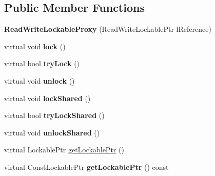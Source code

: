 \subsection*{Public Member Functions}
\begin{DoxyCompactItemize}
\item 
\hypertarget{classcore_1_1threading_1_1_read_write_lockable_proxy_a268b0c3c396187ceccc854818b2d453a}{{\bfseries Read\-Write\-Lockable\-Proxy} (Read\-Write\-Lockable\-Ptr l\-Reference)}\label{classcore_1_1threading_1_1_read_write_lockable_proxy_a268b0c3c396187ceccc854818b2d453a}

\item 
\hypertarget{classcore_1_1threading_1_1_read_write_lockable_proxy_a3dff7ca646b12dd59c38137608e5d05a}{virtual void {\bfseries lock} ()}\label{classcore_1_1threading_1_1_read_write_lockable_proxy_a3dff7ca646b12dd59c38137608e5d05a}

\item 
\hypertarget{classcore_1_1threading_1_1_read_write_lockable_proxy_a15ea3ee9e5b51e20a7a77162fdf71ad2}{virtual bool {\bfseries try\-Lock} ()}\label{classcore_1_1threading_1_1_read_write_lockable_proxy_a15ea3ee9e5b51e20a7a77162fdf71ad2}

\item 
\hypertarget{classcore_1_1threading_1_1_read_write_lockable_proxy_a5bdc3f607841dcbf6d0d81da1a869f2c}{virtual void {\bfseries unlock} ()}\label{classcore_1_1threading_1_1_read_write_lockable_proxy_a5bdc3f607841dcbf6d0d81da1a869f2c}

\item 
\hypertarget{classcore_1_1threading_1_1_read_write_lockable_proxy_a2ca2e1f62a2abd2d42a8f9b30893ebc6}{virtual void {\bfseries lock\-Shared} ()}\label{classcore_1_1threading_1_1_read_write_lockable_proxy_a2ca2e1f62a2abd2d42a8f9b30893ebc6}

\item 
\hypertarget{classcore_1_1threading_1_1_read_write_lockable_proxy_a3f661528f6f5e1cd11b01cc61de84bfe}{virtual bool {\bfseries try\-Lock\-Shared} ()}\label{classcore_1_1threading_1_1_read_write_lockable_proxy_a3f661528f6f5e1cd11b01cc61de84bfe}

\item 
\hypertarget{classcore_1_1threading_1_1_read_write_lockable_proxy_ab408b65006128f69ab84f7814768e159}{virtual void {\bfseries unlock\-Shared} ()}\label{classcore_1_1threading_1_1_read_write_lockable_proxy_ab408b65006128f69ab84f7814768e159}

\item 
virtual Lockable\-Ptr \hyperlink{classcore_1_1threading_1_1_read_write_lockable_proxy_a57f858156dcd2e331a8eb1820025372f}{get\-Lockable\-Ptr} ()
\item 
\hypertarget{classcore_1_1threading_1_1_read_write_lockable_proxy_a4200322dc9b97c9f4c1cd0f3e1d77c16}{virtual Const\-Lockable\-Ptr {\bfseries get\-Lockable\-Ptr} () const }\label{classcore_1_1threading_1_1_read_write_lockable_proxy_a4200322dc9b97c9f4c1cd0f3e1d77c16}


\end{DoxyCompactItemize}
